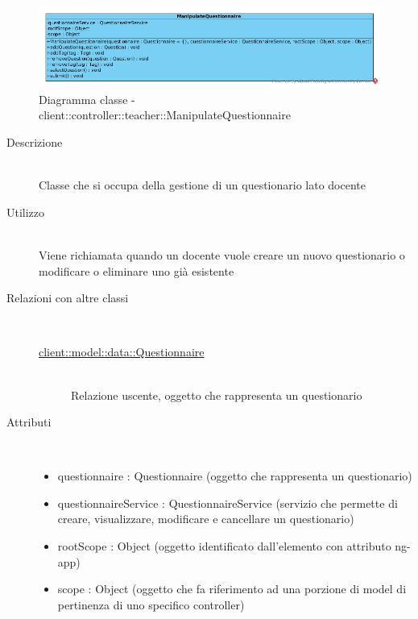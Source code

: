 \vspace{0.5cm}
\hypertarget{client::controller::teacher::ManipulateQuestionnaire}{}
\begin{center}
			\begin{figure}[H]
				\centering \includegraphics[scale=4, max width=\textwidth, max height=\myheight]{../img/diagrammiClassi/client/controller/teacher/ManipulateQuestionnaire.png}
				\caption{Diagramma classe - client::controller::teacher::ManipulateQuestionnaire}
			\end{figure}
		\end{center}\begin{description}
\item[Descrizione] \hfill \\
 Classe che si occupa della gestione di un questionario lato docente
\item[Utilizzo] \hfill \\
 Viene richiamata quando un docente vuole creare un nuovo questionario o modificare o eliminare uno già esistente
\item[Relazioni con altre classi] \hfill \\
 \vspace{-7mm}
\begin{description}
\item[\hyperlink{client::model::data::Questionnaire}{client::model::data::Questionnaire}] \hfill \\
 Relazione uscente, oggetto che rappresenta un questionario
\end{description}

\item[Attributi] \hfill \\
 \vspace{-7mm}
\begin{itemize}
\item questionnaire : Questionnaire (oggetto che rappresenta un questionario)
\item questionnaireService : QuestionnaireService (servizio che permette di creare, visualizzare, modificare e cancellare un questionario)
\item rootScope : Object (oggetto identificato dall’elemento con attributo ng-app)
\item scope : Object (oggetto che fa riferimento ad una porzione di model di pertinenza di uno specifico controller)
\end{itemize}


\end{description}
